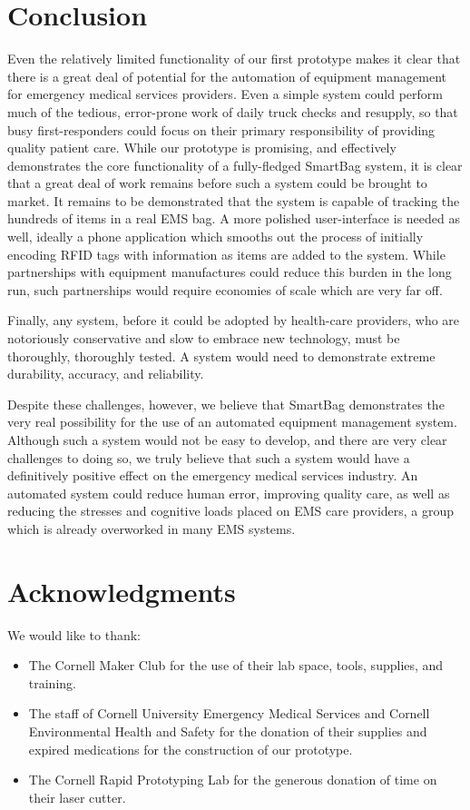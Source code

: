 \documentclass{sigchi}
\begin{document}
\section{Conclusion} \label{conclusion}
Even the relatively limited functionality of our first prototype makes it clear
that there is a great deal of potential for the automation of equipment management
for emergency medical services providers. Even a simple system could perform much
of the tedious, error-prone work of daily truck checks and resupply, so that
busy first-responders could focus on their primary responsibility of providing
quality patient care. While our prototype is promising, and effectively demonstrates
the core functionality of a fully-fledged SmartBag system, it is clear that a great
deal of work remains before such a system could be brought to market. It remains to
be demonstrated that the system is capable of tracking the hundreds of items in a
real EMS bag. A more polished user-interface is needed as well, ideally a phone
application which smooths out the process of initially encoding RFID tags with
information as items are added to the system. While partnerships with equipment
manufactures could reduce this burden in the long run, such partnerships would
require economies of scale which are very far off.

Finally, any system, before it could be adopted by health-care providers, who
are notoriously conservative and slow to embrace new technology, must be
thoroughly, thoroughly tested. A system would need to demonstrate extreme
durability, accuracy, and reliability.

Despite these challenges, however, we believe that SmartBag demonstrates the
very real possibility for the use of an automated equipment management system.
Although such a system would not be easy to develop, and there are very clear
challenges to doing so, we truly believe that such a system would have a
definitively positive effect on the emergency medical services industry. An
automated system could reduce human error, improving quality care, as well as
reducing the stresses and cognitive loads placed on EMS care providers, a
group which is already overworked in many EMS systems.


\section{Acknowledgments} \label{acknowledgements}
We would like to thank:
\begin{itemize}
\item The Cornell Maker Club for the use of their lab space, tools, supplies,
	and training.
\item The staff of Cornell University Emergency Medical Services and Cornell
	Environmental Health and Safety for the donation of their supplies and
    expired medications for the construction of our prototype. 
\item The Cornell Rapid Prototyping Lab for the generous donation of time on their
	laser cutter.
\end{itemize}

\balance



\end{document}
